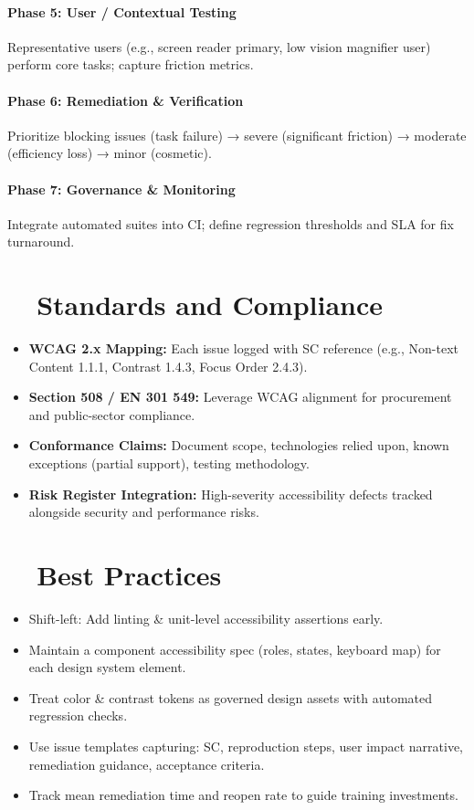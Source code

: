 \paragraph{Phase 5: User / Contextual Testing} Representative users (e.g., screen reader primary, low vision magnifier user) perform core tasks; capture friction metrics.
\paragraph{Phase 6: Remediation \& Verification} Prioritize blocking issues (task failure) → severe (significant friction) → moderate (efficiency loss) → minor (cosmetic).
\paragraph{Phase 7: Governance \& Monitoring} Integrate automated suites into CI; define regression thresholds and SLA for fix turnaround.

\section{~~Standards and Compliance}\label{sec:standards-compliance-auditing}
\begin{itemize}
	\item \textbf{WCAG 2.x Mapping:} Each issue logged with SC reference (e.g., Non-text Content 1.1.1, Contrast 1.4.3, Focus Order 2.4.3).
	\item \textbf{Section 508 / EN 301 549:} Leverage WCAG alignment for procurement and public-sector compliance.
	\item \textbf{Conformance Claims:} Document scope, technologies relied upon, known exceptions (partial support), testing methodology.
	\item \textbf{Risk Register Integration:} High-severity accessibility defects tracked alongside security and performance risks.
\end{itemize}

\section{~~Best Practices}\label{sec:best-practices-auditing}
\begin{itemize}
	\item Shift-left: Add linting \& unit-level accessibility assertions early.
	\item Maintain a component accessibility spec (roles, states, keyboard map) for each design system element.
	\item Treat color \& contrast tokens as governed design assets with automated regression checks.
	\item Use issue templates capturing: SC, reproduction steps, user impact narrative, remediation guidance, acceptance criteria.
	\item Track mean remediation time and reopen rate to guide training investments.
\end{itemize}

